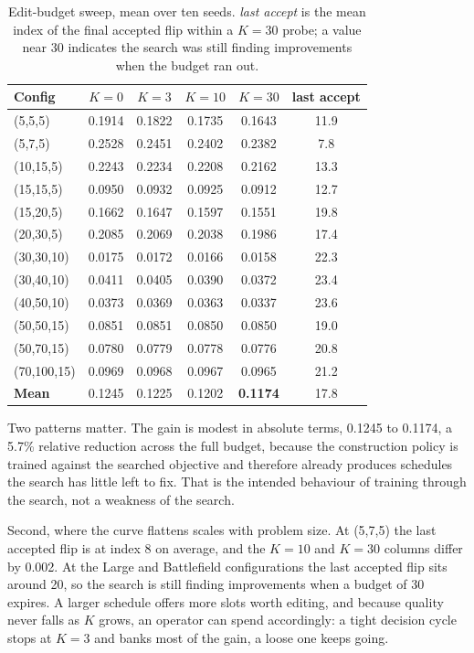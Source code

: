 \begin{table}[t]
\centering
\small
\caption{Edit-budget sweep, mean over ten seeds. \emph{last accept} is the
mean index of the final accepted flip within a $K{=}30$ probe; a value near 30
indicates the search was still finding improvements when the budget ran out.}
\label{tab:budget}
\begin{tabular}{@{}lccccc@{}}
\toprule
Config & $K{=}0$ & $K{=}3$ & $K{=}10$ & $K{=}30$ & last accept \\
\midrule
(5,5,5)     & 0.1914 & 0.1822 & 0.1735 & 0.1643 & 11.9 \\
(5,7,5)     & 0.2528 & 0.2451 & 0.2402 & 0.2382 & 7.8 \\
(10,15,5)   & 0.2243 & 0.2234 & 0.2208 & 0.2162 & 13.3 \\
(15,15,5)   & 0.0950 & 0.0932 & 0.0925 & 0.0912 & 12.7 \\
(15,20,5)   & 0.1662 & 0.1647 & 0.1597 & 0.1551 & 19.8 \\
(20,30,5)   & 0.2085 & 0.2069 & 0.2038 & 0.1986 & 17.4 \\
(30,30,10)  & 0.0175 & 0.0172 & 0.0166 & 0.0158 & 22.3 \\
(30,40,10)  & 0.0411 & 0.0405 & 0.0390 & 0.0372 & 23.4 \\
(40,50,10)  & 0.0373 & 0.0369 & 0.0363 & 0.0337 & 23.6 \\
(50,50,15)  & 0.0851 & 0.0851 & 0.0850 & 0.0850 & 19.0 \\
(50,70,15)  & 0.0780 & 0.0779 & 0.0778 & 0.0776 & 20.8 \\
(70,100,15) & 0.0969 & 0.0968 & 0.0967 & 0.0965 & 21.2 \\
\midrule
\textbf{Mean} & 0.1245 & 0.1225 & 0.1202 & \textbf{0.1174} & 17.8 \\
\bottomrule
\end{tabular}
\end{table}

Two patterns matter. The gain is modest in absolute terms, 0.1245 to 0.1174,
a 5.7\% relative reduction across the full budget, because the construction
policy is trained against the searched objective and therefore already
produces schedules the search has little left to fix. That is the intended
behaviour of training through the search, not a weakness of the search.

Second, where the curve flattens scales with problem size. At (5,7,5) the last
accepted flip is at index 8 on average, and the $K{=}10$ and $K{=}30$ columns
differ by 0.002. At the Large and Battlefield configurations the last accepted
flip sits around 20, so the search is still finding improvements when a budget
of 30 expires. A larger schedule offers more slots worth editing, and
because quality never falls as $K$ grows, an operator can
spend accordingly: a tight decision cycle stops at $K{=}3$ and banks most of
the gain, a loose one keeps going.

